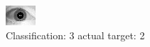 \begin{figure}[h!]
\begin{center}
\includegraphics[width=0.60\columnwidth]{figures/ID1639_class_3_target_2.png}
\end{center}
\caption{ Classification: 3 actual target: 2}
\label{fig:ID1639_class_3_target_2}
\end{figure}
